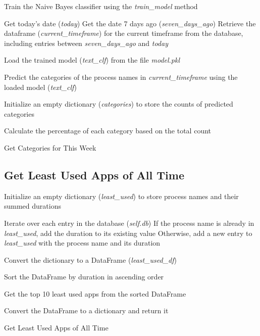 \documentclass[openany]{report}
\begin{document}
\begin{algorithm}[H]
    \SetAlgoLined
    \BlankLine

    Train the Naive Bayes classifier using the \textit{train\_model} method\;

    Get today's date (\textit{today})\;
    Get the date 7 days ago (\textit{seven\_days\_ago})\;
    Retrieve the dataframe (\textit{current\_timeframe}) for the current timeframe from the database, including entries between \textit{seven\_days\_ago} and \textit{today}\;

    Load the trained model (\textit{text\_clf}) from the file \textit{model.pkl}\;

    Predict the categories of the process names in \textit{current\_timeframe} using the loaded model (\textit{text\_clf})\;

    Initialize an empty dictionary (\textit{categories}) to store the counts of predicted categories\;


    Calculate the percentage of each category based on the total count\;

    \BlankLine

    \caption{Get Categories for This Week}
\end{algorithm}

\subsection{Get Least Used Apps of All Time}

\begin{algorithm}[H]
    \SetAlgoLined
    \BlankLine

    Initialize an empty dictionary (\textit{least\_used}) to store process names and their summed durations\;

    Iterate over each entry in the database (\textit{self.db})\;
    \Indp
    If the process name is already in \textit{least\_used}, add the duration to its existing value\;
    Otherwise, add a new entry to \textit{least\_used} with the process name and its duration\;
    \Indm

    Convert the dictionary to a DataFrame (\textit{least\_used\_df})\;

    Sort the DataFrame by duration in ascending order\;

    Get the top 10 least used apps from the sorted DataFrame\;

    Convert the DataFrame to a dictionary and return it\;
    \BlankLine

    \caption{Get Least Used Apps of All Time}
\end{algorithm}
\end{document}
